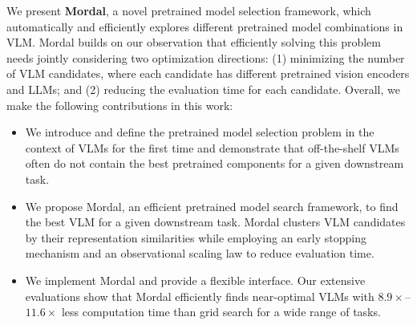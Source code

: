 We present \textbf{Mordal}, a novel pretrained model selection framework, which automatically and efficiently explores different pretrained model combinations in VLM.
Mordal builds on our observation that efficiently solving this problem needs jointly considering two optimization directions: (1) minimizing the number of VLM candidates, where each candidate has different pretrained vision encoders and LLMs; and (2) reducing the evaluation time for each candidate. Overall, we make the following contributions in this work: 
\begin{itemize}
    \item We introduce and define the pretrained model selection problem in the context of VLMs for the first time and demonstrate that off-the-shelf VLMs often do not contain the best pretrained components for a given downstream task. 
    \item We propose Mordal, an efficient pretrained model search framework, to find the best VLM for a given downstream task. Mordal clusters VLM candidates by their representation similarities while employing an early stopping mechanism and an observational scaling law to reduce evaluation time.   
    \item We implement Mordal and provide a flexible interface. Our extensive evaluations show that Mordal efficiently finds near-optimal VLMs with $8.9\times$--$11.6\times$ less computation time than grid search for a wide range of tasks.
\end{itemize}
\vspace{-3mm}



